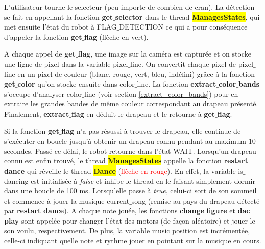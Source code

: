 \documentclass{article}
\begin{document}
    L'utilisateur tourne le selecteur (peu importe de combien de cran). La détection se fait en appellant la fonction \textbf{get$\_$selector} dans le thread \colorbox{yellow}{\textbf{ManagesStates}}, qui met ensuite l'état du robot à \textcolor{bleu}{FLAG$\_$DETECTION} ce qui a pour conséquence d'appeler la fonction \textbf{get$\_$flag} (\textcolor{vert}{flèche en vert}). \par
    
    A chaque appel de \textbf{get$\_$flag}, une image sur la caméra est capturée et on stocke une ligne de pixel dans la variable \textcolor{bleu}{pixel$\_$line}. On convertit chaque pixel de \textcolor{bleu}{pixel$\_$line} en un pixel de couleur (blanc, rouge, vert, bleu, indéfini) grâce à la fonction \textbf{get$\_$color} qu'on stocke ensuite dans \textcolor{bleu}{color$\_$line}. La fonction \textbf{extract$\_$color$\_$bands} s'occupe d'analyser \textcolor{bleu}{color$\_$line} (voir section \ref{extract_color_bands}) pour en extraire les grandes bandes de même couleur correspondant au drapeau présenté. Finalement, \textbf{extract$\_$flag} en déduit le drapeau et le retourne à \textbf{get$\_$flag}. \par
    
    Si la fonction \textbf{get$\_$flag} n'a pas résussi à trouver le drapeau, elle continue de s'exécuter en boucle jusqu'à obtenir un drapeau connu pendant au maximum 10 secondes. Passé ce délai, le robot retourne dans l'état \textcolor{bleu}{WAIT}. Lorsqu'un drapeau connu est enfin trouvé, le thread \colorbox{yellow}{\textbf{ManagesStates}} appelle la fonction \textbf{restart$\_$dance} qui réveille le thread \colorbox{yellow}{\textbf{Dance}} (\textcolor{red}{flèche en rouge}). En effet, la variable \textcolor{bleu}{is$\_$dancing} est initialisée à \textit{false} et inhibe le thread en le faisant simplement dormir dans une boucle de 100 ms. Lorsqu'elle passe à \textit{true}, celui-ci sort de son sommeil et commence à jouer la musique \textcolor{bleu}{current$\_$song} (remise au pays du drapeau détecté par \textbf{restart$\_$dance}). A chaque note jouée, les fonctions \textbf{change$\_$figure} et \textbf{dac$\_$play} sont appelée pour changer l'état des motors (de façon aléatoire) et jouer le son voulu, respectivement. De plus, la variable \textcolor{bleu}{music$\_$position} est incrémentée, celle-ci indiquant quelle note et rythme jouer en pointant sur la musique en cours.
\end{document}
